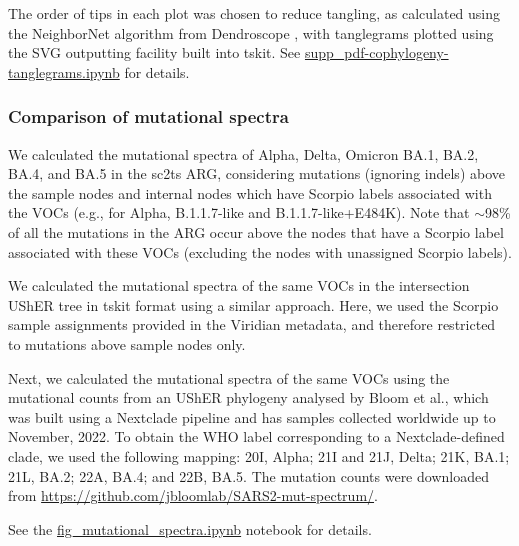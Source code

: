 \documentclass[12pt]{article}
\begin{document}
The order of tips in each plot was chosen to reduce tangling,
as calculated using the NeighborNet algorithm from
Dendroscope \cite{Scornavacca2011,Huson2012},
with tanglegrams plotted using the SVG outputting facility built into tskit.
See \href{https://github.com/jeromekelleher/sc2ts-paper/blob/main/notebooks/supp\_pdf-cophylogeny-tanglegrams.ipynb}{supp\_pdf-cophylogeny-tanglegrams.ipynb}
for details.

\subsubsection*{Comparison of mutational spectra}

We calculated the mutational spectra of Alpha, Delta, Omicron BA.1, BA.2, BA.4, and BA.5
in the sc2ts ARG, considering mutations (ignoring indels) above the sample
nodes and internal nodes
which have Scorpio labels associated with the VOCs
(e.g., for Alpha, B.1.1.7-like and B.1.1.7-like+E484K).
Note that $\sim$98\% of all the mutations in the ARG occur
above the nodes that have a Scorpio label associated with these VOCs
(excluding the nodes with unassigned Scorpio labels).

We calculated the mutational spectra of the same VOCs
in the intersection UShER tree in tskit format using a similar approach.
Here, we used the Scorpio sample assignments provided in the Viridian metadata,
and therefore restricted to mutations above sample nodes only.

Next, we calculated the mutational spectra of the same VOCs
using the mutational counts from an UShER phylogeny
analysed by Bloom et al.\cite{Bloom2023},
which was built using a Nextclade pipeline and
has samples collected worldwide up to November, 2022.
To obtain the WHO label corresponding to a Nextclade-defined clade, we used the following mapping:
20I, Alpha; 21I and 21J, Delta; 21K, BA.1; 21L, BA.2; 22A, BA.4; and 22B, BA.5.
The mutation counts were downloaded from
\url{https://github.com/jbloomlab/SARS2-mut-spectrum/}.

See the
\href{https://github.com/jeromekelleher/sc2ts-paper/blob/main/notebooks/fig\_mutational\_spectra.ipynb}{fig\_mutational\_spectra.ipynb}
notebook for details.
\end{document}
